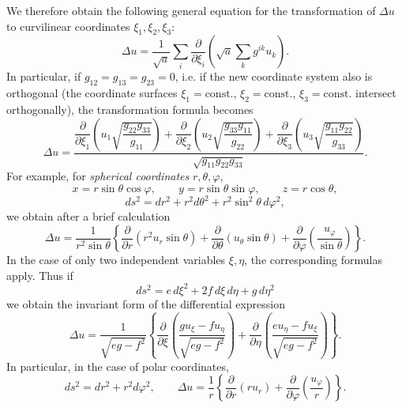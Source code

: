 We therefore obtain the following general equation for the transformation of $\Delta u$ to curvilinear coordinates $\xi_1,\xi_2,\xi_3$:
\begin{equation}\tag{61}
\Delta u=\frac1{\sqrt a}\sum_i\frac{\partial}{\partial\xi_i}
\left(\sqrt a\sum_k g^{ik}u_k\right).
\end{equation}
In particular, if $g_{12}=g_{13}=g_{23}=0$, i.e. if the new coordinate system also is orthogonal (the coordinate surfaces $\xi_1=\text{const.}$, $\xi_2=\text{const.}$, $\xi_3=\text{const.}$ intersect orthogonally), the transformation formula becomes
\begin{equation}\tag{62}
\Delta u=
\frac{\dfrac{\partial}{\partial\xi_1}\left(u_1\sqrt{\dfrac{g_{22}g_{33}}{g_{11}}}\right)
+\dfrac{\partial}{\partial\xi_2}\left(u_2\sqrt{\dfrac{g_{33}g_{11}}{g_{22}}}\right)
+\dfrac{\partial}{\partial\xi_3}\left(u_3\sqrt{\dfrac{g_{11}g_{22}}{g_{33}}}\right)}
{\sqrt{g_{11}g_{22}g_{33}}}.
\end{equation}
For example, for \emph{spherical coordinates} $r,\theta,\varphi$,
\[
x=r\sin\theta\cos\varphi,\qquad y=r\sin\theta\sin\varphi,\qquad z=r\cos\theta,
\]
\[
ds^2=dr^2+r^2d\theta^2+r^2\sin^2\theta\,d\varphi^2,
\]
we obtain after a brief calculation
\begin{equation}\tag{63}
\Delta u=\frac1{r^2\sin\theta}
\left\{\frac{\partial}{\partial r}(r^2u_r\sin\theta)
+\frac{\partial}{\partial\theta}(u_\theta\sin\theta)
+\frac{\partial}{\partial\varphi}\left(\frac{u_\varphi}{\sin\theta}\right)\right\}.
\end{equation}
In the case of only two independent variables $\xi,\eta$, the corresponding formulas apply. Thus if
\[
ds^2=e\,d\xi^2+2f\,d\xi\,d\eta+g\,d\eta^2
\]
we obtain the invariant form of the differential expression
\begin{equation}\tag{64}
\Delta u=\frac1{\sqrt{eg-f^2}}
\left\{\frac{\partial}{\partial\xi}\left(\frac{g u_\xi-fu_\eta}{\sqrt{eg-f^2}}\right)
+\frac{\partial}{\partial\eta}\left(\frac{e u_\eta-fu_\xi}{\sqrt{eg-f^2}}\right)\right\}.
\end{equation}
In particular, in the case of polar coordinates,
\begin{equation}\tag{65}
ds^2=dr^2+r^2d\varphi^2,
\qquad
\Delta u=\frac1r\left\{\frac{\partial}{\partial r}(ru_r)+\frac{\partial}{\partial\varphi}\left(\frac{u_\varphi}{r}\right)\right\}.
\end{equation}

